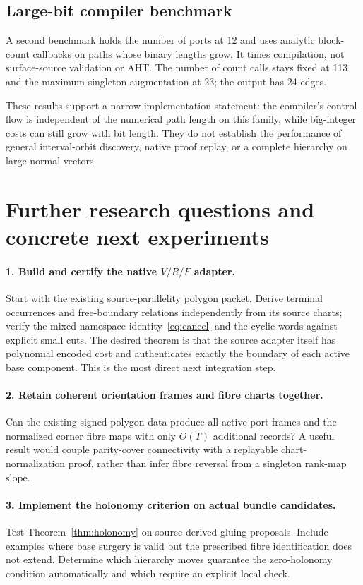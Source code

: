 \documentclass[11pt]{article}
\theoremstyle{definition}
\theoremstyle{remark}\newtheorem{remark}[theorem]{Remark}
\begin{document}
\subsection{Large-bit compiler benchmark}
A second benchmark holds the number of ports at 12 and uses analytic block-count callbacks on paths whose binary lengths grow. It times compilation, not surface-source validation or AHT. The number of count calls stays fixed at 113 and the maximum singleton augmentation at 23; the output has 24 edges.



These results support a narrow implementation statement: the compiler's control flow is independent of the numerical path length on this family, while big-integer costs can still grow with bit length. They do not establish the performance of general interval-orbit discovery, native proof replay, or a complete hierarchy on large normal vectors.

\section{Further research questions and concrete next experiments}
\label{sec:future}

\paragraph{1. Build and certify the native $V/R/F$ adapter.}
Start with the existing source-parallelity polygon packet. Derive terminal occurrences and free-boundary relations independently from its source charts; verify the mixed-namespace identity~\eqref{eq:cancel} and the cyclic words against explicit small cuts. The desired theorem is that the source adapter itself has polynomial encoded cost and authenticates exactly the boundary of each active base component. This is the most direct next integration step.

\paragraph{2. Retain coherent orientation frames and fibre charts together.}
Can the existing signed polygon data produce all active port frames and the normalized corner fibre maps with only $O(T)$ additional records? A useful result would couple parity-cover connectivity with a replayable chart-normalization proof, rather than infer fibre reversal from a singleton rank-map slope.

\paragraph{3. Implement the holonomy criterion on actual bundle candidates.}
Test Theorem~\ref{thm:holonomy} on source-derived gluing proposals. Include examples where base surgery is valid but the prescribed fibre identification does not extend. Determine which hierarchy moves guarantee the zero-holonomy condition automatically and which require an explicit local check.
\end{document}
